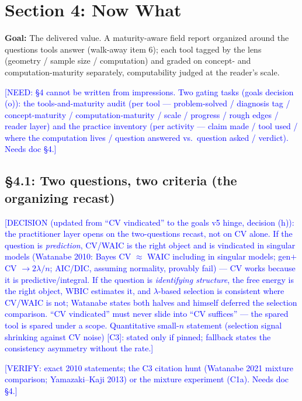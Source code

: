 \documentclass[11pt]{article}
\newcommand{\tagg}[1]{\textcolor{blue}{[#1]}}
\begin{document}
\section{Section 4: Now What}

\textbf{Goal:} The delivered value. A maturity-aware field report
organized around the questions tools answer (walk-away item 6); each
tool tagged by the lens (geometry / sample size / computation) and
graded on concept- and computation-maturity separately, computability
judged at the reader's scale.

\tagg{NEED: \S4 cannot be written from impressions. Two gating tasks
(goals decision (o)): the tools-and-maturity audit (per tool ---
problem-solved / diagnosis tag / concept-maturity /
computation-maturity / scale / progress / rough edges / reader layer)
and the practice inventory (per activity --- claim made / tool used /
where the computation lives / question answered vs.\ question asked /
verdict). Needs doc \S4.}

\subsection*{\S4.1: Two questions, two criteria (the organizing recast)}

\tagg{DECISION (updated from ``CV vindicated'' to the goals v5 hinge,
decision (h)): the practitioner layer opens on the two-questions recast,
not on CV alone. If the question is \emph{prediction}, CV/WAIC is the
right object and is vindicated in singular models (Watanabe 2010: Bayes
CV $\approx$ WAIC including in singular models; gen$+$CV $\to
2\lambda/n$; AIC/DIC, assuming normality, provably fail) --- CV works
because it is predictive/integral. If the question is \emph{identifying
structure}, the free energy is the right object, WBIC estimates it, and
$\lambda$-based selection is consistent where CV/WAIC is not; Watanabe
states both halves and himself deferred the selection comparison. ``CV
vindicated'' must never slide into ``CV suffices'' --- the spared tool
is spared under a scope. Quantitative small-$n$ statement (selection
signal shrinking against CV noise) [C3]: stated only if pinned;
fallback states the consistency asymmetry without the rate.}

\tagg{VERIFY: exact 2010 statements; the C3 citation hunt (Watanabe 2021
mixture comparison; Yamazaki--Kaji 2013) or the mixture experiment
(C1a). Needs doc \S4.}
\end{document}
